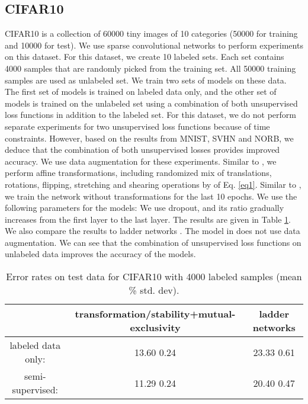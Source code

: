 \documentclass{article}
\begin{document}
\subsection{CIFAR10}
\vspace{-0.1cm}
CIFAR10 is a collection of 60000 tiny  images of 10 categories (50000 for training and 10000 for test). We use sparse convolutional networks to perform experiments on this dataset. For this dataset, we create 10 labeled sets. Each set contains 4000 samples that are randomly picked from the training set. All 50000 training samples are used as unlabeled set. We train two sets of models on these data. The first set of models is trained on labeled data only, and the other set of models is trained on the unlabeled set using a combination of both unsupervised loss functions in addition to the labeled set. For this dataset, we do not perform separate experiments for two unsupervised loss functions because of time constraints. However, based on the results from MNIST, SVHN and NORB, we deduce that the combination of both unsupervised losses provides improved accuracy. We use data augmentation for these experiments. Similar to \cite{graham2014fractional}, we perform affine transformations, including randomized mix of translations, rotations, flipping, stretching and shearing operations by  of Eq. \ref{eq1}. Similar to \cite{graham2014fractional}, we train the network without transformations for the last 10 epochs. We use the following parameters for the models:  We use dropout, and its ratio gradually increases from the first layer to the last layer. The results are given in Table \ref{tab1}. We also compare the results to ladder networks \cite{rasmus2015semi}. The model in \cite{rasmus2015semi} does not use data augmentation. We can see that the combination of unsupervised loss functions on unlabeled data improves the accuracy of the models.
\begin{table}[h]
  \caption{Error rates on test data for CIFAR10 with 4000 labeled samples (mean \%  std. dev).}
  \begin{center}
  \begin{tabular}{ c  c  c }
 \rule[-1.2ex]{0pt}{0ex}		         &  transformation/stability+mutual-exclusivity & ladder networks \cite{rasmus2015semi} \\ \hline     
 \rule{0pt}{3ex}     labeled data only:  &  13.60  0.24 &  23.33  0.61   \\
                      semi-supervised:   &  11.29  0.24 &  20.40  0.47   \\              
  \end{tabular}  
  \end{center}
  \label{tab1}
\end{table}
\end{document}
